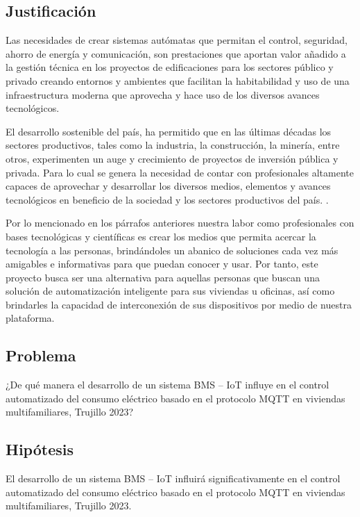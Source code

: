 \documentclass[a4paper, 12pt]{article}
\begin{document}
\subsection{Justificación}

Las necesidades de crear sistemas autómatas que permitan el control, seguridad, ahorro de energía y comunicación, son prestaciones que aportan valor añadido a la gestión técnica en los proyectos de edificaciones para los sectores público y privado creando entornos y ambientes que facilitan la habitabilidad y uso de una infraestructura moderna que aprovecha y hace uso de los diversos avances tecnológicos.

\vspace{0.25cm}
El desarrollo sostenible del país, ha permitido que en las últimas décadas los sectores productivos, tales como la industria, la construcción, la minería, entre otros, experimenten un auge y crecimiento de proyectos de inversión pública y privada. Para lo cual se genera la necesidad de contar con profesionales altamente capaces de aprovechar y desarrollar los diversos medios, elementos y avances tecnológicos en beneficio de la sociedad y los sectores productivos del país. \citep{ARTICLE:2}.

\vspace{0.25cm}
Por lo mencionado en los párrafos anteriores nuestra labor como profesionales con bases tecnológicas y científicas es crear los medios que permita acercar la tecnología a las personas, brindándoles un abanico de soluciones cada vez más amigables e informativas para que puedan conocer y usar. Por tanto, este proyecto busca ser una alternativa para aquellas personas que buscan una solución de automatización inteligente para sus viviendas u oficinas, así como brindarles la capacidad de interconexión de sus dispositivos por medio de nuestra plataforma.


\subsection{Problema}
¿De qué manera el desarrollo de un sistema BMS – IoT influye en el control automatizado del consumo eléctrico basado en el protocolo MQTT en viviendas multifamiliares, Trujillo 2023? 


\subsection{Hipótesis}
El desarrollo de un sistema BMS – IoT influirá significativamente en el control automatizado del consumo eléctrico basado en el protocolo MQTT en viviendas multifamiliares, Trujillo 2023.  
\end{document}
